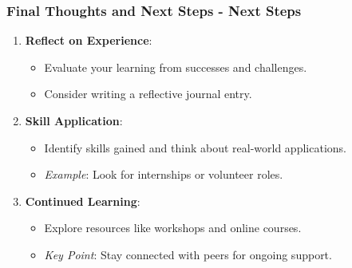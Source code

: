 \documentclass[aspectratio=169]{beamer}
\begin{document}
\begin{frame}[fragile]
    \frametitle{Final Thoughts and Next Steps - Next Steps}
    \begin{enumerate}
        \item \textbf{Reflect on Experience}:
            \begin{itemize}
                \item Evaluate your learning from successes and challenges.
                \item Consider writing a reflective journal entry.
            \end{itemize}
        
        \item \textbf{Skill Application}:
            \begin{itemize}
                \item Identify skills gained and think about real-world applications.
                \item \textit{Example}: Look for internships or volunteer roles.
            \end{itemize}
        
        \item \textbf{Continued Learning}:
            \begin{itemize}
                \item Explore resources like workshops and online courses.
                \item \textit{Key Point}: Stay connected with peers for ongoing support.
            \end{itemize}
    \end{enumerate}
\end{frame}
\end{document}
